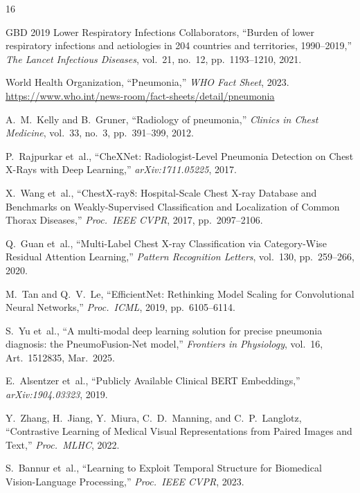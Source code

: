 \documentclass[conference]{IEEEtran}
\begin{document}
{\small
\begin{thebibliography}{16}

GBD 2019 Lower Respiratory Infections Collaborators, ``Burden of lower respiratory infections and aetiologies in 204 countries and territories, 1990--2019,'' \emph{The Lancet Infectious Diseases}, vol.~21, no.~12, pp.~1193--1210, 2021.

World Health Organization, ``Pneumonia,'' \emph{WHO Fact Sheet}, 2023.
\url{https://www.who.int/news-room/fact-sheets/detail/pneumonia}

A.~M.~Kelly and B.~Gruner, ``Radiology of pneumonia,'' \emph{Clinics in Chest Medicine}, vol.~33, no.~3, pp.~391--399, 2012.

P.~Rajpurkar et~al., ``CheXNet: Radiologist-Level Pneumonia Detection on Chest X-Rays with Deep Learning,'' \emph{arXiv:1711.05225}, 2017.

X.~Wang et~al., ``ChestX-ray8: Hospital-Scale Chest X-ray Database and Benchmarks on Weakly-Supervised Classification and Localization of Common Thorax Diseases,'' \emph{Proc.\ IEEE CVPR}, 2017, pp.~2097--2106.

Q.~Guan et~al., ``Multi-Label Chest X-ray Classification via Category-Wise Residual Attention Learning,'' \emph{Pattern Recognition Letters}, vol.~130, pp.~259--266, 2020.

M.~Tan and Q.~V.~Le, ``EfficientNet: Rethinking Model Scaling for Convolutional Neural Networks,'' \emph{Proc.\ ICML}, 2019, pp.~6105--6114.

S.~Yu et~al., ``A multi-modal deep learning solution for precise pneumonia diagnosis: the PneumoFusion-Net model,'' \emph{Frontiers in Physiology}, vol.~16, Art.~1512835, Mar.\ 2025.

E.~Alsentzer et~al., ``Publicly Available Clinical BERT Embeddings,'' \emph{arXiv:1904.03323}, 2019.

Y.~Zhang, H.~Jiang, Y.~Miura, C.~D.~Manning, and C.~P.~Langlotz, ``Contrastive Learning of Medical Visual Representations from Paired Images and Text,'' \emph{Proc.\ MLHC}, 2022.

S.~Bannur et~al., ``Learning to Exploit Temporal Structure for Biomedical Vision-Language Processing,'' \emph{Proc.\ IEEE CVPR}, 2023.


\end{thebibliography}}
\end{document}
